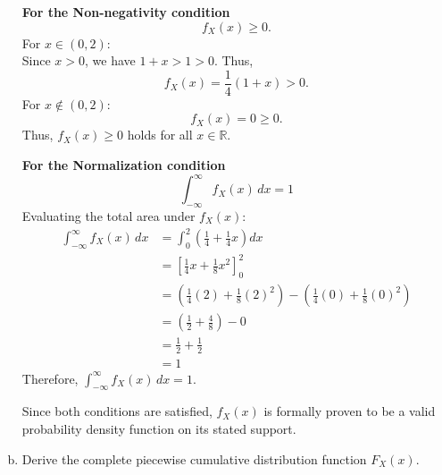 \documentclass[letterpaper,12pt]{article}
\begin{document}
\begin{enumerate}[(a)]
\begin{list}{}{}
        \vspace{0.5em}
        \textbf{For the Non-negativity condition}\\
        \[  f_X(x) \ge 0.\]
            \quad For $x \in (0, 2)$: 
            \\Since $x > 0$, we have $1 + x > 1 > 0$. Thus,
            \[f_X(x) = \frac{1}{4}(1 + x) > 0.\]
            \quad For $x \notin (0, 2)$:
            \[f_X(x) = 0 \ge 0.\]
        \noindent Thus, $f_X(x) \ge 0$ holds for all $x \in \mathbb{R}$.

       \noindent\textbf{For the Normalization condition}
        \[
        \int_{-\infty}^{\infty} f_X(x) \, dx = 1
        \]
        Evaluating the total area under $f_X(x)$:
        \begin{align*}
        \int_{-\infty}^{\infty} f_X(x) \, dx 
        &= \int_{0}^{2} \left( \frac{1}{4} + \frac{1}{4}x \right) dx \\
        &= \left[ \frac{1}{4}x + \frac{1}{8}x^2 \right]_{0}^{2} \\
        &= \left( \frac{1}{4}(2) + \frac{1}{8}(2)^2 \right) - \left( \frac{1}{4}(0) + \frac{1}{8}(0)^2 \right) \\
        &= \left( \frac{1}{2} + \frac{4}{8} \right) - 0 \\
        &= \frac{1}{2} + \frac{1}{2} \\
        &= 1
        \end{align*}
        Therefore, $\int_{-\infty}^{\infty} f_X(x) \, dx = 1$.

        
        Since both conditions are satisfied, $f_X(x)$ is formally proven to be a valid probability density function on its stated support.
    \end{list}
    \item Derive the complete piecewise cumulative distribution function $F_X(x)$.
  \vspace{0.5em}
\end{enumerate}
\end{document}
